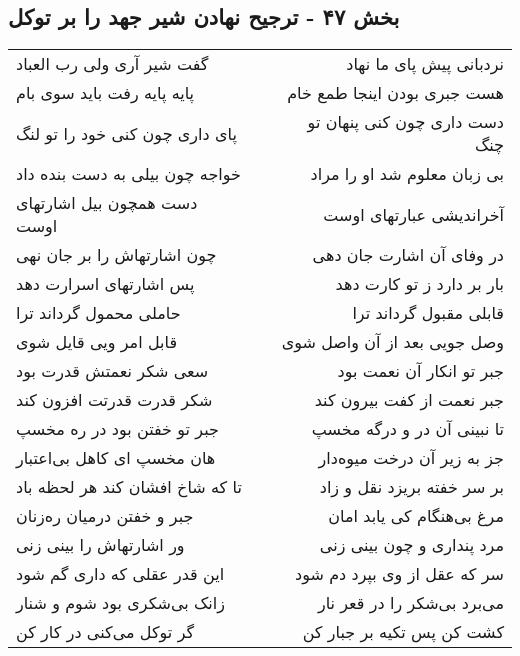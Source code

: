 \begin{center}
\section*{بخش ۴۷ - ترجیح نهادن شیر جهد را بر توکل}
\label{sec:sh047}
\begin{longtable}{l p{0.5cm} r}
گفت شیر آری ولی رب العباد
&&
نردبانی پیش پای ما نهاد
\\
پایه پایه رفت باید سوی بام
&&
هست جبری بودن اینجا طمع خام
\\
پای داری چون کنی خود را تو لنگ
&&
دست داری چون کنی پنهان تو چنگ
\\
خواجه چون بیلی به دست بنده داد
&&
بی زبان معلوم شد او را مراد
\\
دست همچون بیل اشارتهای اوست
&&
آخراندیشی عبارتهای اوست
\\
چون اشارتهاش را بر جان نهی
&&
در وفای آن اشارت جان دهی
\\
پس اشارتهای اسرارت دهد
&&
بار بر دارد ز تو کارت دهد
\\
حاملی محمول گرداند ترا
&&
قابلی مقبول گرداند ترا
\\
قابل امر ویی قایل شوی
&&
وصل جویی بعد از آن واصل شوی
\\
سعی شکر نعمتش قدرت بود
&&
جبر تو انکار آن نعمت بود
\\
شکر قدرت قدرتت افزون کند
&&
جبر نعمت از کفت بیرون کند
\\
جبر تو خفتن بود در ره مخسپ
&&
تا نبینی آن در و درگه مخسپ
\\
هان مخسپ ای کاهل بی‌اعتبار
&&
جز به زیر آن درخت میوه‌دار
\\
تا که شاخ افشان کند هر لحظه باد
&&
بر سر خفته بریزد نقل و زاد
\\
جبر و خفتن درمیان ره‌زنان
&&
مرغ بی‌هنگام کی یابد امان
\\
ور اشارتهاش را بینی زنی
&&
مرد پنداری و چون بینی زنی
\\
این قدر عقلی که داری گم شود
&&
سر که عقل از وی بپرد دم شود
\\
زانک بی‌شکری بود شوم و شنار
&&
می‌برد بی‌شکر را در قعر نار
\\
گر توکل می‌کنی در کار کن
&&
کشت کن پس تکیه بر جبار کن
\\
\end{longtable}
\end{center}
